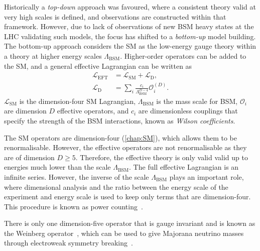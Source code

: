 Historically a \emph{top-down} approach was favoured, where a consistent theory valid at very high scales is defined, and observations are constructed within that framework. However, due to lack of observations of new BSM heavy states at the LHC validating such models, the focus has shifted to a \emph{bottom-up} model building. The bottom-up approach considers the SM as the low-energy gauge theory within a theory at higher energy scales $\Lambda_{\mathrm{BSM}}$. Higher-order operators can be added to the SM, and a general effective Lagrangian can be written as
\begin{equation}
    \label{eq:eftLagrangian}
    \begin{aligned}
        \mathcal{L}_\mathrm{EFT} &=  \mathcal{L}_\mathrm{SM} +  \mathcal{L}_\mathrm{D},\\
        \mathcal{L}_\mathrm{D}   &= \sum_i \frac{c_i}{\Lambda_{\mathrm{BSM}}^{D-4}}\mathcal{O}^{(D)}_i.
     \end{aligned}
\end{equation}
$\mathcal{L}_\mathrm{SM}$ is the dimension-four SM Lagrangian, $\Lambda_{\mathrm{BSM}}$ is the mass scale for BSM, $\mathcal{O}_i$ are dimension $D$ effective operators, and $c_i$ are dimensionless couplings that specify the strength of the BSM interactions, known as \emph{Wilson coefficients}. 

The SM operators are dimension-four (\cref{chap:SM}), which allows them to be renormalisable.  However, the effective operators are not renormalisable as they are of dimension $D \geq 5$. Therefore, the effective theory is only valid valid up to energies much lower than the scale $\Lambda_\mathrm{BSM}$. The full effective Lagrangian is an infinite series. However, the inverse of the scale $\Lambda_\mathrm{BSM}$ plays an important role, where dimensional analysis and the ratio between the energy scale of the experiment and energy scale  is used to keep only terms that are dimension-four. This procedure is known as power counting~\cite{Contino_2016}. 

There is only one dimension-five operator that is gauge invariant and is known as the Weinberg operator~\cite{Weinberg:1979sa}, which can be used to give Majorana neutrino masses through electroweak symmetry breaking~\cite{Jenkins_2018}.

